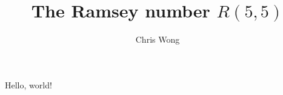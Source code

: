 \documentclass{article}
\begin{document}
\author{Chris Wong}
\title{The Ramsey number $R(5,5)$}
\maketitle

Hello, world!
\end{document}
